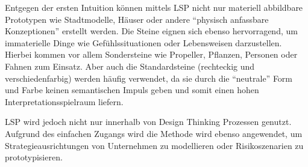 Entgegen der ersten Intuition können mittels LSP nicht nur materiell abbildbare Prototypen wie Stadtmodelle, Häuser oder andere ``physisch anfassbare Konzeptionen'' erstellt werden. Die Steine eignen sich ebenso hervorragend, um immaterielle Dinge wie Gefühlssituationen oder Lebensweisen darzustellen. Hierbei kommen vor allem Sondersteine wie Propeller, Pflanzen, Personen oder Fahnen zum Einsatz. Aber auch die Standardsteine (rechteckig und verschiedenfarbig) werden häufig verwendet, da sie durch die ``neutrale'' Form und Farbe keinen semantischen Impuls geben und somit einen hohen Interpretationsspielraum liefern. \newline

LSP wird jedoch nicht nur innerhalb von Design Thinking Prozessen genutzt. Aufgrund des einfachen Zugangs wird die Methode wird ebenso angewendet, um Strategieausrichtungen von Unternehmen zu modellieren oder Risikoszenarien zu prototypisieren.